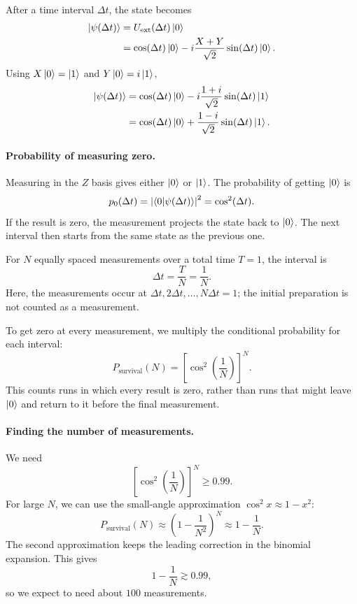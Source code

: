 \documentclass[11pt]{article}
\begin{document}
After a time interval $\Delta t$, the state becomes
\[
\begin{aligned}
\ket{\psi(\Delta t)}
&=U_{\mathrm{ext}}(\Delta t)\ket{0}\\
&=\cos(\Delta t)\ket{0}
-i\frac{X+Y}{\sqrt{2}}\sin(\Delta t)\ket{0}.
\end{aligned}
\]
Using $X\ket{0}=\ket{1}$ and $Y\ket{0}=i\ket{1}$,
\[
\begin{aligned}
\ket{\psi(\Delta t)}
&=\cos(\Delta t)\ket{0}
-i\frac{1+i}{\sqrt{2}}\sin(\Delta t)\ket{1}\\
&=\cos(\Delta t)\ket{0}
+\frac{1-i}{\sqrt{2}}\sin(\Delta t)\ket{1}.
\end{aligned}
\]

\paragraph{Probability of measuring zero.}
Measuring in the $Z$ basis gives either $\ket{0}$ or
$\ket{1}$. The probability of getting $\ket{0}$ is
\[
p_0(\Delta t)
=
\left|\braket{0|\psi(\Delta t)}\right|^2
=
\cos^2(\Delta t).
\]
If the result is zero, the measurement projects the
state back to $\ket{0}$. The next interval then starts
from the same state as the previous one.

For $N$ equally spaced measurements over a total time
$T=1$, the interval is
\[
\Delta t=\frac{T}{N}=\frac{1}{N}.
\]
Here, the measurements occur at $\Delta t,2\Delta t,
\ldots,N\Delta t=1$; the initial preparation is not
counted as a measurement.

To get zero at every measurement, we multiply the
conditional probability for each interval:
\[
\boxed{
P_{\mathrm{survival}}(N)
=
\left[\cos^2\left(\frac{1}{N}\right)\right]^N.
}
\]
This counts runs in which every result is zero,
rather than runs that might leave $\ket{0}$ and
return to it before the final measurement.

\paragraph{Finding the number of measurements.}
We need
\[
\left[\cos^2\left(\frac{1}{N}\right)\right]^N
\geq 0.99.
\]
For large $N$, we can use the small-angle approximation
$\cos^2 x\approx 1-x^2$:
\[
P_{\mathrm{survival}}(N)
\approx
\left(1-\frac{1}{N^2}\right)^N
\approx
1-\frac{1}{N}.
\]
The second approximation keeps the leading correction
in the binomial expansion. This gives
\[
1-\frac{1}{N}\gtrsim 0.99,
\]
so we expect to need about $100$ measurements.
\end{document}
